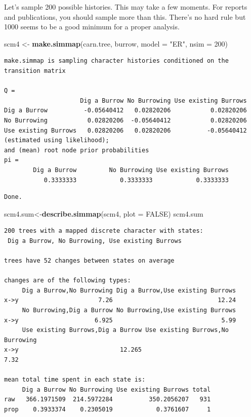 \documentclass[
]{book}
\newenvironment{Shaded}{\begin{snugshade}}{\end{snugshade}}
\newcommand{\DataTypeTok}[1]{\textcolor[rgb]{0.13,0.29,0.53}{#1}}
\newcommand{\DecValTok}[1]{\textcolor[rgb]{0.00,0.00,0.81}{#1}}
\newcommand{\KeywordTok}[1]{\textcolor[rgb]{0.13,0.29,0.53}{\textbf{#1}}}
\newcommand{\NormalTok}[1]{#1}
\newcommand{\OtherTok}[1]{\textcolor[rgb]{0.56,0.35,0.01}{#1}}
\newcommand{\StringTok}[1]{\textcolor[rgb]{0.31,0.60,0.02}{#1}}
\begin{document}
Let's sample 200 possible histories. This may take a few moments. For reports and publications, you should sample more than this. There's no hard rule but 1000 seems to be a good minimum for a proper analysis.

\begin{Shaded}
\begin{Highlighting}[]
\NormalTok{scm4 \textless{}{-}}\StringTok{ }\KeywordTok{make.simmap}\NormalTok{(carn.tree, burrow, }\DataTypeTok{model =} \StringTok{"ER"}\NormalTok{, }\DataTypeTok{nsim =} \DecValTok{200}\NormalTok{)}
\end{Highlighting}
\end{Shaded}

\begin{verbatim}
make.simmap is sampling character histories conditioned on the transition matrix

Q =
                     Dig a Burrow No Burrowing Use existing Burrows
Dig a Burrow          -0.05640412   0.02820206           0.02820206
No Burrowing           0.02820206  -0.05640412           0.02820206
Use existing Burrows   0.02820206   0.02820206          -0.05640412
(estimated using likelihood);
and (mean) root node prior probabilities
pi =
        Dig a Burrow         No Burrowing Use existing Burrows 
           0.3333333            0.3333333            0.3333333 
\end{verbatim}

\begin{verbatim}
Done.
\end{verbatim}

\begin{Shaded}
\begin{Highlighting}[]
\NormalTok{scm4.sum\textless{}{-}}\KeywordTok{describe.simmap}\NormalTok{(scm4, }\DataTypeTok{plot =} \OtherTok{FALSE}\NormalTok{)}
\NormalTok{scm4.sum}
\end{Highlighting}
\end{Shaded}

\begin{verbatim}
200 trees with a mapped discrete character with states:
 Dig a Burrow, No Burrowing, Use existing Burrows 

trees have 52 changes between states on average

changes are of the following types:
     Dig a Burrow,No Burrowing Dig a Burrow,Use existing Burrows
x->y                      7.26                             12.24
     No Burrowing,Dig a Burrow No Burrowing,Use existing Burrows
x->y                     6.925                              5.99
     Use existing Burrows,Dig a Burrow Use existing Burrows,No Burrowing
x->y                            12.265                              7.32

mean total time spent in each state is:
     Dig a Burrow No Burrowing Use existing Burrows total
raw   366.1971509  214.5972284          350.2056207   931
prop    0.3933374    0.2305019            0.3761607     1
\end{verbatim}
\end{document}
